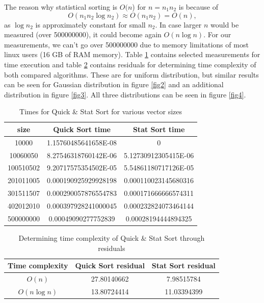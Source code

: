 \documentclass[12pt]{article}
\begin{document}
		The reason why statistical sorting is $O(n$) for $n = n_1 n_2$ is because of
		\[
		O(n_1 n_2 \log n_2) \approx O(n_1 n_2) = O(n),
		\]
		as $\log n_2$ is approximately constant for small $n_2$. In case larger $n$ would be measured (over 500000000), it could become again $O(n \log n)$. For our measurements, we can't go over 500000000 due to memory limitations of most linux users (16 GB of RAM memory). Table \ref{table1} contains selected measurements for time execution and table \ref{table2} contains residuals for determining time complexity of both compared algorithms. These are for uniform distribution, but similar results can be seen for Gaussian distribution in figure \ref{fig2} and an additional distribution in figure \ref{fig3}. All three distributions can be seen in figure \ref{fig4}.
		
		\begin{table}
		\caption{Times for Quick \& Stat Sort for various vector sizes}
		\begin{center}
		\begin{tabular}{ |c|c|c| }
		
		\hline
		
		size & Quick Sort time & Stat Sort time \\

		\hline\hline		
		
		10000		& 1.15760485641658E-08	& 0 \\
		10060050		& 8.27546318760142E-06	& 5.12730912305415E-06 \\
		100510502	& 9.20717575354502E-05	& 5.54861180717126E-05 \\
		201011005	& 0.000190925929928198	& 0.000110023145680316 \\
		301511507	& 0.000290057876554783	& 0.000171666666574311 \\
		402012010	& 0.000397928241000045	& 0.000232824073464144 \\
		500000000	& 0.00049090277752839	& 0.00028194444894325 \\

		\hline
		\end{tabular}
		\end{center}
		\label{table1}
		\end{table}


		\begin{table}
		\caption{Determining time complexity of Quick \& Stat Sort through residuals}
		\begin{center}
		\begin{tabular}{ |c|c|c| }
		\hline
		
		Time complexity & Quick Sort residual & Stat Sort residual \\

		\hline\hline		
		
		$O(n)$ &		27.80140662 &  7.98515784  \\
		$O(n \log n)$ & 13.80724414		& 11.03394399 \\

		\hline
		\end{tabular}
		\end{center}
		\label{table2}
		\end{table}
\end{document}
